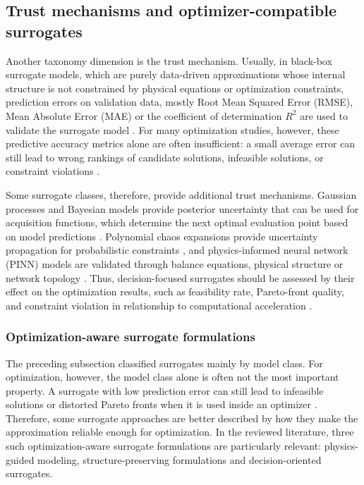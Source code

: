 \documentclass[final,5p,times,twocolumn]{elsarticle}
\begin{document}
\subsection{Trust mechanisms and optimizer-compatible surrogates}
\label{sec:tax:trust-mechanisms}

Another taxonomy dimension is the trust mechanism. Usually, in black-box
surrogate models, which are purely data-driven approximations whose
internal structure is not constrained by physical equations or
optimization constraints, prediction errors on validation data, mostly
Root Mean Squared Error (RMSE), Mean Absolute Error (MAE) or the
coefficient of determination $R^2$ are used to validate the surrogate
model \cite{Westermann2019,Zhang2026_building,Elwy2024}. For many
optimization studies, however, these predictive accuracy metrics alone
are often insufficient: a small average error can still lead to wrong
rankings of candidate solutions, infeasible solutions, or constraint
violations \cite{DiazManriquez2016,Ruan2021221,Khaloie2025,Lim2025}.

Some surrogate classes, therefore, provide additional trust mechanisms.
Gaussian processes and Bayesian models provide posterior uncertainty
that can be used for acquisition functions, which determine the next
optimal evaluation point based on model predictions
\cite{Hu2020,Hu2021671,Tan2026}. Polynomial chaos expansions provide
uncertainty propagation for probabilistic constraints
\cite{Muhlpfordt20194806,Safta20172535,Koirala20242284}, and
physics-informed neural network (PINN) models are validated through
balance equations, physical structure or network topology
\cite{Park2019,Su2022315,Mohammadi2024,Petrova2025,Du2025}. Thus,
decision-focused surrogates should be assessed by their effect on the
optimization results, such as feasibility rate, Pareto-front quality,
and constraint violation in relationship to computational acceleration
\cite{Ruan2021221,Khaloie2025,Lim2025,Chen20244723}.

\subsubsection{Optimization-aware surrogate formulations}
\label{sec:tax:physics-guided}

The preceding subsection classified surrogates mainly by model class.
For optimization, however, the model class alone is often not the most
important property. A surrogate with low prediction error can still lead
to infeasible solutions or distorted Pareto fronts when it is used
inside an optimizer
\cite{DiazManriquez2016,Ruan2021221,Khaloie2025,Lim2025}. Therefore,
some surrogate approaches are better described by how they make the
approximation reliable enough for optimization. In the reviewed
literature, three such optimization-aware surrogate formulations are
particularly relevant: physics-guided modeling, structure-preserving
formulations and decision-oriented surrogates.
\end{document}
